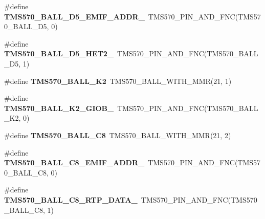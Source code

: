 \begin{DoxyCompactItemize}
\mbox{\label{tms570ls3137zwt-pins_8h_a1b78469f7ee4f7ea520727b190c10d33}} 
\#define {\bfseries T\+M\+S570\+\_\+\+B\+A\+L\+L\+\_\+\+D5\+\_\+\+E\+M\+I\+F\+\_\+\+A\+D\+D\+R\+\_}~T\+M\+S570\+\_\+\+P\+I\+N\+\_\+\+A\+N\+D\+\_\+\+F\+NC(T\+M\+S570\+\_\+\+B\+A\+L\+L\+\_\+\+D5, 0)
\item 
\mbox{\label{tms570ls3137zwt-pins_8h_a49e861c888c55de64204fdb2fd1135a2}} 
\#define {\bfseries T\+M\+S570\+\_\+\+B\+A\+L\+L\+\_\+\+D5\+\_\+\+H\+E\+T2\+\_}~T\+M\+S570\+\_\+\+P\+I\+N\+\_\+\+A\+N\+D\+\_\+\+F\+NC(T\+M\+S570\+\_\+\+B\+A\+L\+L\+\_\+\+D5, 1)
\item 
\mbox{\label{tms570ls3137zwt-pins_8h_a73f7727a388d257b84a344a76c4a2137}} 
\#define {\bfseries T\+M\+S570\+\_\+\+B\+A\+L\+L\+\_\+\+K2}~T\+M\+S570\+\_\+\+B\+A\+L\+L\+\_\+\+W\+I\+T\+H\+\_\+\+M\+MR(21, 1)
\item 
\mbox{\label{tms570ls3137zwt-pins_8h_ac75377ac10b87e94727ac08b5473639b}} 
\#define {\bfseries T\+M\+S570\+\_\+\+B\+A\+L\+L\+\_\+\+K2\+\_\+\+G\+I\+O\+B\+\_}~T\+M\+S570\+\_\+\+P\+I\+N\+\_\+\+A\+N\+D\+\_\+\+F\+NC(T\+M\+S570\+\_\+\+B\+A\+L\+L\+\_\+\+K2, 0)
\item 
\mbox{\label{tms570ls3137zwt-pins_8h_a15a484a467d48395e6d84a888961e6a5}} 
\#define {\bfseries T\+M\+S570\+\_\+\+B\+A\+L\+L\+\_\+\+C8}~T\+M\+S570\+\_\+\+B\+A\+L\+L\+\_\+\+W\+I\+T\+H\+\_\+\+M\+MR(21, 2)
\item 
\mbox{\label{tms570ls3137zwt-pins_8h_ac7d8a45231cb9917e2e48f52920dba1f}} 
\#define {\bfseries T\+M\+S570\+\_\+\+B\+A\+L\+L\+\_\+\+C8\+\_\+\+E\+M\+I\+F\+\_\+\+A\+D\+D\+R\+\_}~T\+M\+S570\+\_\+\+P\+I\+N\+\_\+\+A\+N\+D\+\_\+\+F\+NC(T\+M\+S570\+\_\+\+B\+A\+L\+L\+\_\+\+C8, 0)
\item 
\mbox{\label{tms570ls3137zwt-pins_8h_aa635fc133ea9ad96a6b9f09dfc61ecfb}} 
\#define {\bfseries T\+M\+S570\+\_\+\+B\+A\+L\+L\+\_\+\+C8\+\_\+\+R\+T\+P\+\_\+\+D\+A\+T\+A\+\_}~T\+M\+S570\+\_\+\+P\+I\+N\+\_\+\+A\+N\+D\+\_\+\+F\+NC(T\+M\+S570\+\_\+\+B\+A\+L\+L\+\_\+\+C8, 1)
\item 
\mbox{\label{tms570ls3137zwt-pins_8h_a0893c3f10f0dd964b0e62d7582b0b1c8}} 

\end{DoxyCompactItemize}
